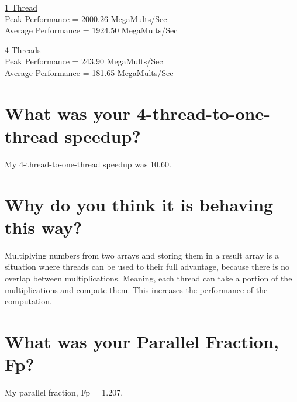 \documentclass[onecolumn,draftclsnofoot, 10pt, compsoc]{IEEEtran}
\begin{document}
	\underline{1 Thread}
	\\
	Peak Performance =  2000.26 MegaMults/Sec
	\\
	Average Performance =  1924.50 MegaMults/Sec
	
	\underline{4 Threads}
	\\
	Peak Performance =  243.90 MegaMults/Sec
	\\
	Average Performance =  181.65 MegaMults/Sec

	
	\section{ What was your 4-thread-to-one-thread speedup?}
	My 4-thread-to-one-thread speedup was 10.60.
	
	
	
	
	\section{ Why do you think it is behaving this way?}
	Multiplying numbers from two arrays and storing them in a result array is a situation where threads can be used to their full advantage, because there is no overlap between multiplications. Meaning, each thread can take a portion of the multiplications and compute them. This increases the performance of the computation.
	
	
	
	
	\section{ What was your Parallel Fraction, Fp?}
	My parallel fraction, Fp = 1.207.
	
	
	
	
\end{document}
